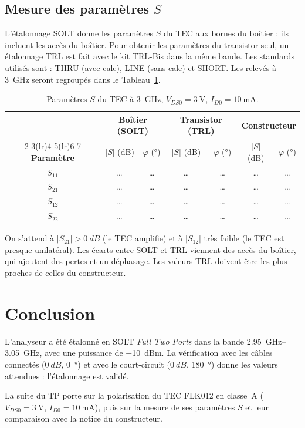 \documentclass[12pt,a4paper]{article}
\newcommand{\arel}{\textcolor{gris}{…}}
\begin{document}
\subsection{Mesure des paramètres $S$}

L’étalonnage SOLT donne les paramètres $S$ du TEC aux bornes du boîtier : ils incluent les
accès du boîtier. Pour obtenir les paramètres du transistor seul, un étalonnage TRL est fait avec
le kit TRL-Bis dans la même bande. Les standards utilisés sont : THRU (avec cale), LINE (sans
cale) et SHORT. Les relevés à \SI{3}{\giga\hertz} seront regroupés dans le
Tableau~\ref{tab:S}.

\begin{table}[H]
\centering
\begin{tabular}{c cc cc cc}
\toprule
 & \multicolumn{2}{c}{\textbf{Boîtier (SOLT)}} & \multicolumn{2}{c}{\textbf{Transistor (TRL)}} & \multicolumn{2}{c}{\textbf{Constructeur}} \\
\cmidrule(lr){2-3}\cmidrule(lr){4-5}\cmidrule(lr){6-7}
\textbf{Paramètre} & $|S|$ (dB) & $\varphi$ (°) & $|S|$ (dB) & $\varphi$ (°) & $|S|$ (dB) & $\varphi$ (°) \\
\midrule
$S_{11}$ & \arel & \arel & \arel & \arel & \arel & \arel \\
$S_{21}$ & \arel & \arel & \arel & \arel & \arel & \arel \\
$S_{12}$ & \arel & \arel & \arel & \arel & \arel & \arel \\
$S_{22}$ & \arel & \arel & \arel & \arel & \arel & \arel \\
\bottomrule
\end{tabular}
\caption{Paramètres $S$ du TEC à \SI{3}{\giga\hertz}, $V_{DS0} = \SI{3}{\volt}$, $I_{D0} = \SI{10}{\milli\ampere}$.}
\label{tab:S}
\end{table}

On s’attend à $|S_{21}| > \SI{0}{dB}$ (le TEC amplifie) et à $|S_{12}|$ très faible (le TEC est
presque unilatéral). Les écarts entre SOLT et TRL viennent des accès du boîtier, qui ajoutent
des pertes et un déphasage. Les valeurs TRL doivent être les plus proches de celles du
constructeur.

\section{Conclusion}

L’analyseur a été étalonné en SOLT \textit{Full Two Ports} dans la bande
\SIrange{2,95}{3,05}{\giga\hertz}, avec une puissance de \SI{-10}{dBm}. La vérification avec les
câbles connectés ($\SI{0}{dB}$, \SI{0}{\degree}) et avec le court-circuit ($\SI{0}{dB}$,
\SI{180}{\degree}) donne les valeurs attendues : l’étalonnage est validé.

La suite du TP porte sur la polarisation du TEC FLK012 en classe~A ($V_{DS0} = \SI{3}{\volt}$,
$I_{D0} = \SI{10}{\milli\ampere}$), puis sur la mesure de ses paramètres $S$ et leur comparaison
avec la notice du constructeur.
\end{document}
